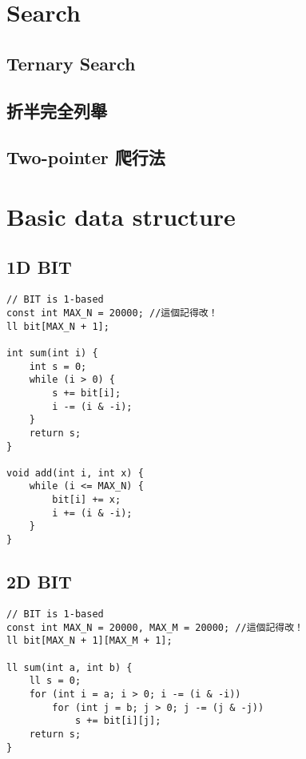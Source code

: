 \documentclass[10pt,oneside]{article}
\begin{document}
\begin{landscape}
\begin{multicols}{2}

\section{Search}

\subsection{Ternary Search}

\subsection{折半完全列舉}

\subsection{Two-pointer 爬行法}


\section{Basic data structure}

\subsection{1D BIT}

\begin{lstlisting}
// BIT is 1-based
const int MAX_N = 20000; //這個記得改！
ll bit[MAX_N + 1];

int sum(int i) {
    int s = 0;
    while (i > 0) {
        s += bit[i];
        i -= (i & -i);
    }
    return s;
}

void add(int i, int x) {
    while (i <= MAX_N) {
        bit[i] += x;
        i += (i & -i);
    }
}
\end{lstlisting}

\subsection{2D BIT}

\begin{lstlisting}
// BIT is 1-based
const int MAX_N = 20000, MAX_M = 20000; //這個記得改！
ll bit[MAX_N + 1][MAX_M + 1];

ll sum(int a, int b) {
    ll s = 0;
    for (int i = a; i > 0; i -= (i & -i))
        for (int j = b; j > 0; j -= (j & -j))
            s += bit[i][j];
    return s;
}


\end{lstlisting}
\end{multicols}
\end{landscape}
\end{document}
